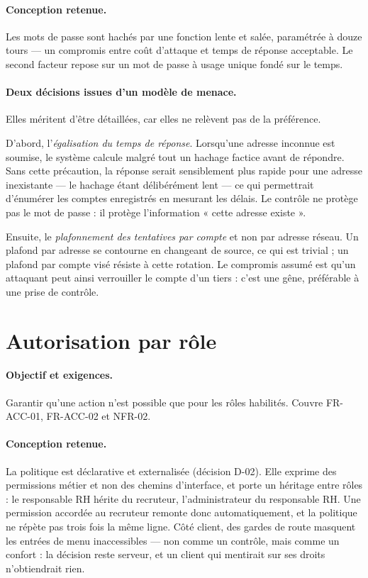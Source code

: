 \paragraph{Conception retenue.} Les mots de passe sont hachés par une fonction
lente et salée, paramétrée à douze tours — un compromis entre coût d'attaque et
temps de réponse acceptable. Le second facteur repose sur un mot de passe à
usage unique fondé sur le temps.

\paragraph{Deux décisions issues d'un modèle de menace.} Elles méritent d'être
détaillées, car elles ne relèvent pas de la préférence.

D'abord, l'\emph{égalisation du temps de réponse}. Lorsqu'une adresse inconnue
est soumise, le système calcule malgré tout un hachage factice avant de
répondre. Sans cette précaution, la réponse serait sensiblement plus rapide
pour une adresse inexistante — le hachage étant délibérément lent — ce qui
permettrait d'énumérer les comptes enregistrés en mesurant les délais. Le
contrôle ne protège pas le mot de passe : il protège l'information
« cette adresse existe ».

Ensuite, le \emph{plafonnement des tentatives par compte} et non par adresse
réseau. Un plafond par adresse se contourne en changeant de source, ce qui est
trivial ; un plafond par compte visé résiste à cette rotation. Le compromis
assumé est qu'un attaquant peut ainsi verrouiller le compte d'un tiers : c'est
une gêne, préférable à une prise de contrôle.

\section{Autorisation par rôle}
\label{sec:impl_authorization}

\paragraph{Objectif et exigences.} Garantir qu'une action n'est possible que
pour les rôles habilités. Couvre FR-ACC-01, FR-ACC-02 et NFR-02.

\paragraph{Conception retenue.} La politique est déclarative et externalisée
(décision D-02). Elle exprime des permissions métier et non des chemins
d'interface, et porte un héritage entre rôles : le responsable RH hérite du
recruteur, l'administrateur du responsable RH. Une permission accordée au
recruteur remonte donc automatiquement, et la politique ne répète pas trois
fois la même ligne. Côté client, des gardes de route masquent les entrées de
menu inaccessibles — non comme un contrôle, mais comme un confort : la décision
reste serveur, et un client qui mentirait sur ses droits n'obtiendrait rien.

